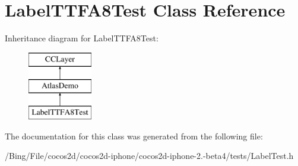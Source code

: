 \hypertarget{interface_label_t_t_f_a8_test}{\section{Label\-T\-T\-F\-A8\-Test Class Reference}
\label{interface_label_t_t_f_a8_test}
}
Inheritance diagram for Label\-T\-T\-F\-A8\-Test\-:\begin{figure}[H]
\begin{center}
\leavevmode
\includegraphics[height=3.000000cm]{interface_label_t_t_f_a8_test}
\end{center}
\end{figure}


The documentation for this class was generated from the following file\-:\begin{DoxyCompactItemize}
\item 
/\-Bing/\-File/cocos2d/cocos2d-\/iphone/cocos2d-\/iphone-\/2.-\/beta4/tests/Label\-Test.\-h\end{DoxyCompactItemize}
